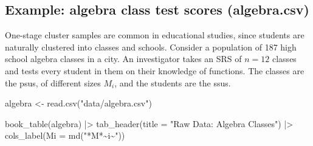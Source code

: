 \documentclass[
  letterpaper,
  DIV=11,
  numbers=noendperiod]{scrreprt}
\newenvironment{Shaded}{\begin{snugshade}}{\end{snugshade}}
\newcommand{\AttributeTok}[1]{\textcolor[rgb]{0.40,0.45,0.13}{#1}}
\newcommand{\FunctionTok}[1]{\textcolor[rgb]{0.28,0.35,0.67}{#1}}
\newcommand{\NormalTok}[1]{\textcolor[rgb]{0.00,0.23,0.31}{#1}}
\newcommand{\OtherTok}[1]{\textcolor[rgb]{0.00,0.23,0.31}{#1}}
\newcommand{\SpecialCharTok}[1]{\textcolor[rgb]{0.37,0.37,0.37}{#1}}
\newcommand{\StringTok}[1]{\textcolor[rgb]{0.13,0.47,0.30}{#1}}
\renewcommand{\[}{\begin{equation}}
\renewcommand{\]}{\end{equation}}
\begin{document}
\subsection{Example: algebra class test scores
(algebra.csv)}\label{sec-cluster-algebra}

One-stage cluster samples are common in educational studies, since
students are naturally clustered into classes and schools. Consider a
population of 187 high school algebra classes in a city. An investigator
takes an SRS of \(n = 12\) classes and tests every student in them on
their knowledge of functions. The classes are the psus, of different
sizes \(M_i\), and the students are the ssus.

\begin{Shaded}
\begin{Highlighting}[]
\NormalTok{algebra }\OtherTok{\textless{}{-}} \FunctionTok{read.csv}\NormalTok{(}\StringTok{"data/algebra.csv"}\NormalTok{)}

\FunctionTok{book\_table}\NormalTok{(algebra) }\SpecialCharTok{|\textgreater{}}
  \FunctionTok{tab\_header}\NormalTok{(}\AttributeTok{title =} \StringTok{"Raw Data: Algebra Classes"}\NormalTok{) }\SpecialCharTok{|\textgreater{}}
  \FunctionTok{cols\_label}\NormalTok{(}\AttributeTok{Mi =} \FunctionTok{md}\NormalTok{(}\StringTok{"*M*\textasciitilde{}i\textasciitilde{}"}\NormalTok{))}
\end{Highlighting}
\end{Shaded}

\begin{table}

\caption{\label{tbl-algebra-raw-data}Raw data: algebra classes (sample)}


\end{table}%
\end{document}
